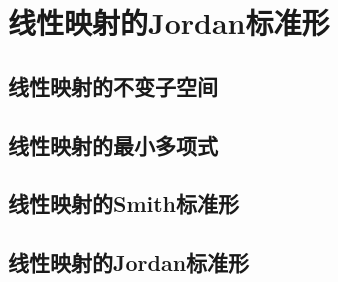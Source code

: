 \documentclass[12pt, a4paper, oneside, UTF8]{ctexbook}
\begin{document}
% 
\else
\fi
\chapter{线性映射的Jordan标准形}
	\section{线性映射的不变子空间}
	\section{线性映射的最小多项式}
	\section{线性映射的Smith标准形}
	\section{线性映射的Jordan标准形}
\ifx\allfiles\undefined
\end{document}
